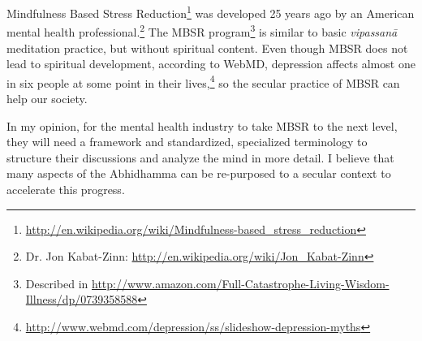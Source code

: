 \color{black}


Mindfulness Based Stress Reduction\footnote{\url{http://en.wikipedia.org/wiki/Mindfulness-based_stress_reduction}} was developed 25 years ago by an American mental health professional.\footnote{Dr. Jon Kabat-Zinn: \url{http://en.wikipedia.org/wiki/Jon_Kabat-Zinn}} The MBSR program\footnote{Described in \url{http://www.amazon.com/Full-Catastrophe-Living-Wisdom-Illness/dp/0739358588}} is similar to basic \textit{vipassanā} meditation practice, but without spiritual content. Even though MBSR does not lead to spiritual development, according to WebMD, depression affects almost one in six people at some point in their lives,\footnote{\url{http://www.webmd.com/depression/ss/slideshow-depression-myths}} so the secular practice of MBSR can help our society. 

In my opinion, for the mental health industry to take MBSR to the next level, they will need a framework and standardized, specialized terminology to structure their discussions and analyze the mind in more detail. I believe that many aspects of the Abhidhamma can be re-purposed to a secular context to accelerate this progress.
